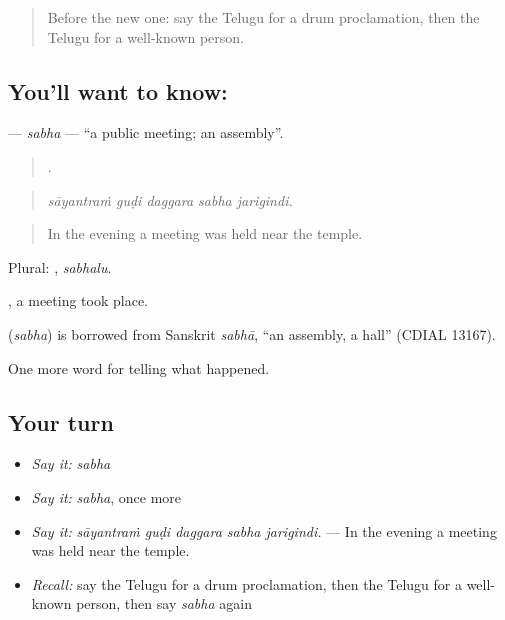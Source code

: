\label{lesson:TE-C342-sabha}



\begin{quote}
Before the new one: say the Telugu for a drum proclamation, then the Telugu for a well-known person.
\end{quote}

\subsection*{You'll want to know: }
\textbf{} — \emph{sabha} — \textquotedblleft{}a public meeting; an assembly\textquotedblright{}.

\begin{quote}
    .
\end{quote}

\begin{quote}
\emph{sāyantraṁ guḍi daggara sabha jarigindi.}
\end{quote}

\begin{quote}
In the evening a meeting was held near the temple.
\end{quote}

Plural: , \emph{sabhalu}.

 , a meeting took place.

\begin{cousinweb}
\textbf{} (\emph{sabha}) is borrowed from Sanskrit \emph{sabhā}, \textquotedblleft{}an assembly, a hall\textquotedblright{} (CDIAL 13167).
\end{cousinweb}

\begin{grammarlens}[title={What you've built}]
One more word for telling what happened.
\end{grammarlens}

\subsection*{Your turn}
\begin{itemize}
\raggedright
  \item \emph{Say it:} \emph{sabha}
  \item \emph{Say it:} \emph{sabha}, once more
  \item \emph{Say it:} \emph{sāyantraṁ guḍi daggara sabha jarigindi.} — In the evening a meeting was held near the temple.
  \item \emph{Recall:} say the Telugu for a drum proclamation, then the Telugu for a well-known person, then say \emph{sabha} again
\end{itemize}

